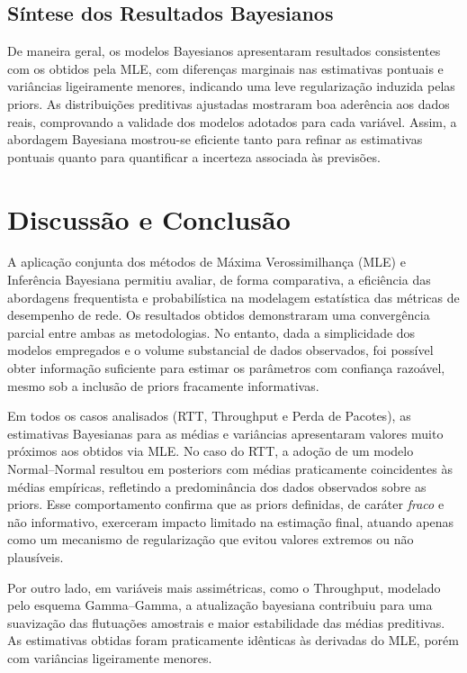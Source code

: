 \documentclass{article}
\begin{document}
\subsection{Síntese dos Resultados Bayesianos}

De maneira geral, os modelos Bayesianos apresentaram resultados consistentes com os obtidos
pela MLE, com diferenças marginais nas estimativas pontuais e variâncias ligeiramente menores,
indicando uma leve regularização induzida pelas priors.  
As distribuições preditivas ajustadas mostraram boa aderência aos dados reais, comprovando
a validade dos modelos adotados para cada variável.  
Assim, a abordagem Bayesiana mostrou-se eficiente tanto para refinar as estimativas
pontuais quanto para quantificar a incerteza associada às previsões.

\section{Discussão e Conclusão}

A aplicação conjunta dos métodos de Máxima Verossimilhança (MLE) e Inferência Bayesiana
permitiu avaliar, de forma comparativa, a eficiência das abordagens frequentista e probabilística
na modelagem estatística das métricas de desempenho de rede.
Os resultados obtidos demonstraram uma convergência parcial entre ambas as metodologias. No entanto, dada a simplicidade dos modelos empregados e o volume substancial de dados observados, foi possível obter informação suficiente para estimar os parâmetros com confiança razoável, mesmo sob a inclusão de priors fracamente informativas.

Em todos os casos analisados (RTT, Throughput e Perda de Pacotes), as estimativas Bayesianas
para as médias e variâncias apresentaram valores muito próximos aos obtidos via MLE.
No caso do RTT, a adoção de um modelo Normal–Normal resultou em posteriors
com médias praticamente coincidentes às médias empíricas, refletindo a predominância dos
dados observados sobre as priors.  
Esse comportamento confirma que as priors definidas, de caráter \textit{fraco} e
não informativo, exerceram impacto limitado na estimação final, atuando apenas como um
mecanismo de regularização que evitou valores extremos ou não plausíveis.

Por outro lado, em variáveis mais assimétricas, como o Throughput,
modelado pelo esquema Gamma–Gamma, a atualização bayesiana contribuiu para uma suavização
das flutuações amostrais e maior estabilidade das médias preditivas.
As estimativas obtidas foram praticamente idênticas às derivadas do MLE,
porém com variâncias ligeiramente menores.
\end{document}
